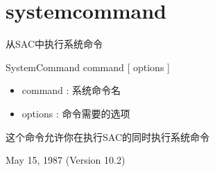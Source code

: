 \section{systemcommand}
\label{cmd:systemcommand}

从SAC中执行系统命令

SystemCommand command [ options ]

\begin{itemize}
\item command : 系统命令名 
\item options : 命令需要的选项 
\end{itemize}

这个命令允许你在执行SAC的同时执行系统命令

May 15, 1987 (Version 10.2)
